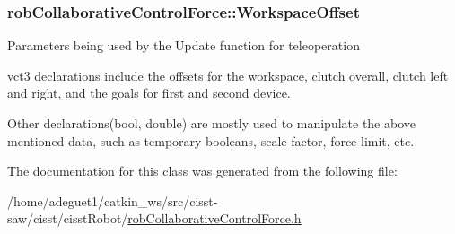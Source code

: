 \hypertarget{classrob_collaborative_control_force_a1f62f6c5fdf922b8cc003bfb39e9880f}{
\subsubsection[{Workspace\-Offset}]{ rob\-Collaborative\-Control\-Force\-::\-Workspace\-Offset\hspace{0.3cm}{\ttfamily [protected]}}}\label{classrob_collaborative_control_force_a1f62f6c5fdf922b8cc003bfb39e9880f}
Parameters being used by the Update function for teleoperation

vct3 declarations include the offsets for the workspace, clutch overall, clutch left and right, and the goals for first and second device.

Other declarations(bool, double) are mostly used to manipulate the above mentioned data, such as temporary booleans, scale factor, force limit, etc. 

The documentation for this class was generated from the following file\-:\begin{DoxyCompactItemize}
\item 
/home/adeguet1/catkin\-\_\-ws/src/cisst-\/saw/cisst/cisst\-Robot/\hyperlink{rob_collaborative_control_force_8h}{rob\-Collaborative\-Control\-Force.\-h}\end{DoxyCompactItemize}

